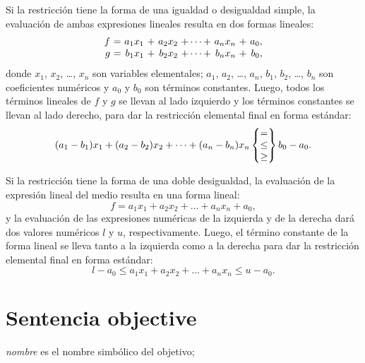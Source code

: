 \documentclass[11pt,spanish]{report}
\begin{document}
Si la restricción tiene la forma de una igualdad o desigualdad simple, la evaluación de ambas expresiones lineales resulta en dos formas lineales:
$$\begin{array}{r@{\ }c@{\ }r@{\ }c@{\ }r@{\ }c@{\ }r@{\ }c@{\ }r}
f&=&a_1x_1&+&a_2x_2&+\dots+&a_nx_n&+&a_0,\\
g&=&b_1x_1&+&b_2x_2&+\dots+&b_nx_n&+&b_0,\\
\end{array}$$
donde $x_1$, $x_2$, \dots, $x_n$ son variables elementales; $a_1$, $a_2$,
\dots, $a_n$, $b_1$, $b_2$, \dots, $b_n$ son coeficientes numéricos y
$a_0$ y $b_0$ son términos constantes. Luego, todos los términos lineales de $f$ y $g$ se llevan al lado izquierdo y los términos constantes se llevan al lado derecho, para dar la restricción elemental final en forma estándar:
$$(a_1-b_1)x_1+(a_2-b_2)x_2+\dots+(a_n-b_n)x_n\left\{
\begin{array}{@{}c@{}}=\\\leq\\\geq\\\end{array}\right\}b_0-a_0.$$

Si la restricción tiene la forma de una doble desigualdad, la evaluación de la expresión lineal del medio resulta en una forma lineal:
$$f=a_1x_1+a_2x_2+\dots+a_nx_n+a_0,$$
y la evaluación de las expresiones numéricas de la izquierda y de la derecha dará dos valores numéricos $l$ y $u$, respectivamente. Luego, el término constante de la forma lineal se lleva tanto a la izquierda como a la derecha para dar la restricción elemental final en forma estándar:
$$l-a_0\leq a_1x_1+a_2x_2+\dots+a_nx_n\leq u-a_0.$$

\section{Sentencia objective}

\noindent
{}

\medskip

\noindent
{\it nombre} es el nombre simbólico del objetivo;
\end{document}
